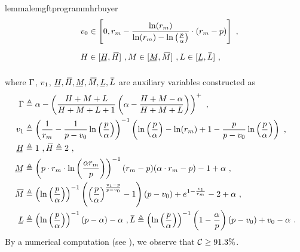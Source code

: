 \begin{restatable}{lemma}{lemgftprogrammhrbuyer}
\begin{align}
\begin{array}{llll}
          \vspace{10pt}
          && \displaystyle\val_0\in \left[0, \optreserve - \frac{\ln(\optreserve)}{\ln(\optreserve) - \ln\left(\frac{\price}{\revratio}\right)}\cdot (\optreserve - \price)\right]~,  & 
          \\
          \vspace{10pt}
          && H\in[\HUnderBar, \HOverBar]~, 
          M\in[\MUnderBar, \MOverBar]~,
          L\in[\LUnderBar, \LOverBar]~,& 
        \end{array}
    \end{align}
    where $\Gamma$, $v_1$, $\HUnderBar, \HOverBar, \MUnderBar, \MOverBar, \LUnderBar, \LOverBar$ are auxiliary variables constructed as 
    \begin{align*}
        \exanteutilratio &\triangleq  \displaystyle
        \revratio - \plus{\frac{H + M + L}{H + M + L + 1}\left(\revratio - \frac{H + M - \revratio}{H + M + L}\right)}~,
        \\
        \val_1 &\triangleq \left(\frac{1}{\optreserve} - \frac{1}{\price - \val_0}\ln\left(\frac{\price}{\revratio}\right)\right)^{-1}\left(
        \ln\left(\frac{\price}{\revratio}\right) - \ln(\optreserve)
        + 1 
        - \frac{\price}{\price-\val_0}\ln\left(\frac{\price}{\revratio}\right) 
        \right)~,
        \\
        \HUnderBar &\triangleq 1~, \HOverBar \triangleq 2~, 
        \\
        \MUnderBar &\triangleq \left(\price\cdot \optreserve\cdot \ln\left(\frac{\revratio\optreserve}{\price}\right)\right)^{-1}(\optreserve-\price)(\revratio\cdot \optreserve-\price) - 1 + \revratio ~,
        \\
        \MOverBar &\triangleq  \left({\ln\left(\frac{\price}{\revratio}\right)}\right)^{-1}\left(\left(\frac{\price}{\revratio}\right)^{\frac{\val_1 - \price}{\price - \val_0}} - 1\right)(\price - \val_0) + e^{1 - \frac{\val_1}{\optreserve}} - 2 + \revratio~,
        \\
        \LUnderBar &\triangleq \left({\ln\left(\frac{\price}{\revratio}\right)}\right)^{-1}(\price - \revratio) - \revratio~,
        \LOverBar \triangleq \left({\ln\left(\frac{\price}{\revratio}\right)}\right)^{-1}\left(1 - \frac{\revratio}{\price}\right)(\price - \val_0) + \val_0 - \revratio ~.
    \end{align*}
    By a numerical computation (see ), we observe that 
    $\mathcal{C}\geq {91.3\%}$.
\end{restatable}




